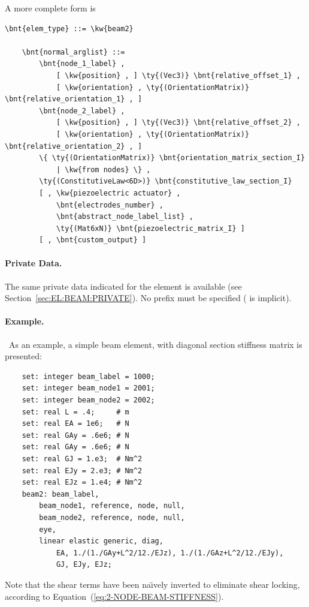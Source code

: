 A more complete form is
\begin{Verbatim}[commandchars=\\\{\}]
    \bnt{elem_type} ::= \kw{beam2}

    \bnt{normal_arglist} ::=
        \bnt{node_1_label} ,
            [ \kw{position} , ] \ty{(Vec3)} \bnt{relative_offset_1} ,
            [ \kw{orientation} , \ty{(OrientationMatrix)} \bnt{relative_orientation_1} , ]
        \bnt{node_2_label} ,
            [ \kw{position} , ] \ty{(Vec3)} \bnt{relative_offset_2} ,
            [ \kw{orientation} , \ty{(OrientationMatrix)} \bnt{relative_orientation_2} , ]
        \{ \ty{(OrientationMatrix)} \bnt{orientation_matrix_section_I}
            | \kw{from nodes} \} ,
        \ty{(ConstitutiveLaw<6D>)} \bnt{constitutive_law_section_I}
        [ , \kw{piezoelectric actuator} , 
            \bnt{electrodes_number} ,
            \bnt{abstract_node_label_list} ,
            \ty{(Mat6xN)} \bnt{piezoelectric_matrix_I} ]
        [ , \bnt{custom_output} ]
\end{Verbatim}

\paragraph{Private Data.}
The same private data indicated for the  element is available
(see Section~\ref{sec:EL:BEAM:PRIVATE}).
No prefix must be specified ( is implicit).


\paragraph{Example.} \
As an example, a simple beam element, with diagonal section stiffness 
matrix is presented:
\begin{verbatim}
    set: integer beam_label = 1000;
    set: integer beam_node1 = 2001;
    set: integer beam_node2 = 2002;
    set: real L = .4;     # m
    set: real EA = 1e6;   # N
    set: real GAy = .6e6; # N
    set: real GAy = .6e6; # N
    set: real GJ = 1.e3;  # Nm^2
    set: real EJy = 2.e3; # Nm^2
    set: real EJz = 1.e4; # Nm^2
    beam2: beam_label,
        beam_node1, reference, node, null,
        beam_node2, reference, node, null,
        eye,
        linear elastic generic, diag,
            EA, 1./(1./GAy+L^2/12./EJz), 1./(1./GAz+L^2/12./EJy),
            GJ, EJy, EJz;
\end{verbatim}
Note that the shear terms have been na\"{\i}vely inverted to eliminate
shear locking, according to Equation~(\ref{eq:2-NODE-BEAM-STIFFNESS}).



